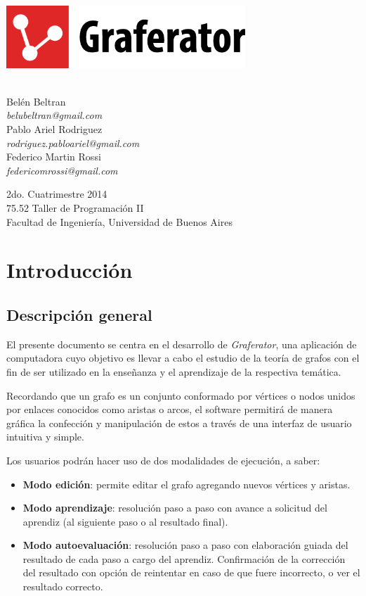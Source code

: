 \documentclass{book}
\makeatletter
\newcommand*{\titleGM}{\begingroup %
\newcommand*{\sepline}{\color{gray85}\rule[0.5ex]{30em}{0.55pt}}
	
	
\begin{center}

	\vspace*{1.5cm} 

	\includegraphics[width=9cm]{images/graferator-logo.png} \\[12\baselineskip]

	
	\colorbox{gray95}{
		\parbox[t]{1.0\linewidth}{
			\vspace*{0.7cm} %
			
			\centering {\Huge\bfseries\color{gray50}\fontfamily{fvs}\selectfont Carpeta de Desarrollo}\par %
			
			\vspace*{0.7cm} %
		}
	}\\[10\baselineskip]


		\Large Belén Beltran \\
		\large \textit{belubeltran@gmail.com} \\ \medskip
		\Large Pablo Ariel Rodriguez \\
		\large \textit{rodriguez.pabloariel@gmail.com} \\ \medskip
		\Large Federico Martin Rossi \\ 
		\large \textit{federicomrossi@gmail.com} \\

		\bigskip\bigskip

		\large 2do. Cuatrimestre 2014 \\ \smallskip
		\large 75.52 Taller de Programación II \\ \smallskip
		\large Facultad de Ingeniería, Universidad de Buenos Aires \\

\end{center}

\endgroup}
\makeatother
\begin{document}

\thispagestyle{empty}


\titleGM




\tableofcontents
\newpage
\thispagestyle{empty}
\thispagestyle{empty}
\thispagestyle{empty}



%
%
\chapter{Introducción}


\section{Descripción general}
	
El presente documento se centra en el desarrollo de \textit{Graferator}, una aplicación de computadora cuyo objetivo es llevar a cabo el estudio de la teoría de grafos con el fin de ser utilizado en la enseñanza y el aprendizaje de la respectiva temática.
\par
Recordando que un grafo es un conjunto conformado por vértices o nodos unidos por enlaces conocidos como aristas o arcos, el software permitirá de manera gráfica la confección y manipulación de estos a través de una interfaz de usuario intuitiva y simple.
\par
Los usuarios podrán hacer uso de dos modalidades de ejecución, a saber:
\medskip

	\begin{itemize}
		\renewcommand{\labelitemi}{\scriptsize\tiny$\blacksquare$} 
		\itemsep=10pt \topsep=0pt \partopsep=0pt \parskip=0pt \parsep=10pt
		
		\item \textbf{Modo edición}: permite editar el grafo agregando nuevos vértices y aristas. 
		
		\item \textbf{Modo aprendizaje}: resolución paso a paso con avance a solicitud del aprendiz (al siguiente paso o al resultado final).

		\item \textbf{Modo autoevaluación}: resolución paso a paso con elaboración guiada del resultado de cada paso a cargo del aprendiz. Confirmación de la corrección del resultado con opción de reintentar en caso de que fuere incorrecto, o ver el resultado correcto.

	\end{itemize}
	\medskip
\end{document}
